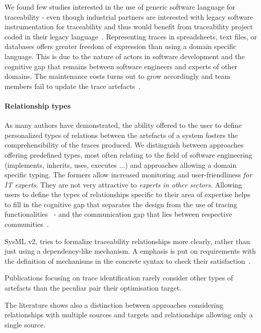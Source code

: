 We found few studies interested in the use of generic software language for traceability - even though industrial partners are interested with legacy software instrumentation for traceability and thus would benefit from traceability project coded in their legacy language~\cite{nejat2012-traceability-sysml-safety-certification}. Representing traces in spreadsheets, text files, or databases offers greater freedom of expression than using a domain specific language. This is due to the nature of actors in software development and the cognitive gap that remains between software engineers and experts of other domains. 
The maintenance costs turns out to grow accordingly and team members fail to update the trace artefacts~\cite{clelandhuang2007bestPracticeForAutomatedTraceability}.

\paragraph{Relationship types} 
As many authors have demonstrated, the ability offered to the user to define personalized types of relations between the artefacts of a system fosters the comprehensibility of the traces produced. We distinguish between approaches offering predefined types, most often relating to the field of software engineering (implements, inherits, uses, executes ...) and approaches allowing a domain specific typing. The formers allow increased monitoring and user-friendliness \textit{for IT experts}. They are not very attractive to \textit{experts in other sectors}. 
Allowing users to define the types of relationships specific to their area of expertise helps to fill in the cognitive gap that separates the design from the use of tracing functionalities~\cite{olive2002-representation-of-generic-relationship-types-in-modeling} - and the communication gap that lies between respective communities~\cite{wohlrab2020-traceability-organization-process-culture}.

SysML v2, tries to formalize traceability relationships more clearly, rather than just using a dependency-like mechanism. A emphasis is put on requirements with the definition of mechanisms in the concrete syntax to check their satisfaction~\cite{Haidrar_2016}.  

Publications focusing on trace identification rarely consider other types of artefacts than the peculiar pair their optimisation target.

The literature shows also a distinction between approaches considering relationships with multiple sources and targets and relationships allowing only a single source.  


